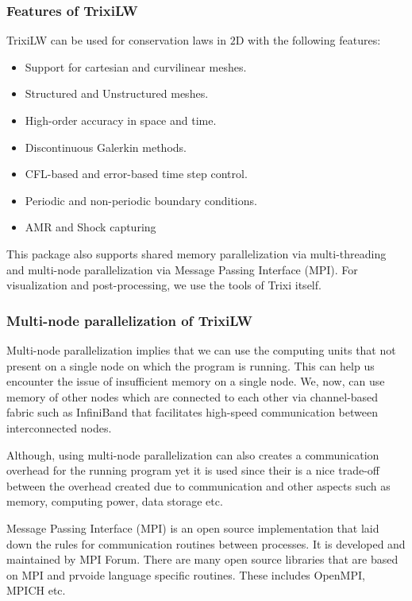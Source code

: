 \documentclass[12pt]{article}
\begin{document}
\subsubsection{Features of {\ttfamily TrixiLW}}
{\ttfamily TrixiLW} can be used for conservation laws in $2$D with the following features:
\begin{itemize}
    \item Support for cartesian and curvilinear meshes.
    \item Structured and Unstructured meshes.
    \item High-order accuracy in space and time.
    \item Discontinuous Galerkin methods.
    \item CFL-based and error-based time step control.
    \item Periodic and non-periodic boundary conditions.
    \item AMR and Shock capturing
\end{itemize}
This package also supports {\ttfamily shared memory} parallelization via {\ttfamily multi-threading} and {\ttfamily multi-node} parallelization via {\ttfamily Message Passing
Interface (MPI)}. For visualization and post-processing, we use the tools of {\ttfamily Trixi} itself.

\subsubsection{{\ttfamily Multi-node} parallelization of {\ttfamily TrixiLW}}
{\ttfamily Multi-node} parallelization implies that we can use the computing units that not present on a single node on which the program is running. This can help us encounter
the issue of insufficient memory on a single node. We, now, can use memory of other nodes which are connected to each other via channel-based fabric such as {\ttfamily InfiniBand}
that facilitates high-speed communication between interconnected nodes. 

Although, using {\ttfamily multi-node} parallelization can also creates a communication overhead for the running program yet it is used since their is a nice trade-off between
the overhead created due to communication and other aspects such as memory, computing power, data storage etc. 

Message Passing Interface (MPI) is an open source implementation that laid down the rules for communication routines between processes. It is developed and maintained by MPI Forum.
There are many open source libraries that are based on MPI and prvoide language specific routines. These includes {\ttfamily OpenMPI, MPICH} etc.
\end{document}

